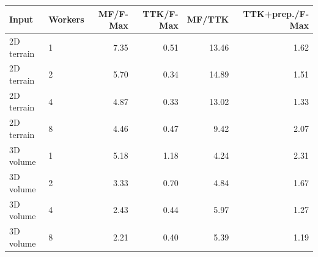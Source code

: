 \begin{tabular}{llrrrr}
\toprule
Input & Workers & MF/F-Max & TTK/F-Max & MF/TTK & TTK+prep./F-Max \\
\midrule
2D terrain & 1 & 7.35 & 0.51 & 13.46 & 1.62 \\
2D terrain & 2 & 5.70 & 0.34 & 14.89 & 1.51 \\
2D terrain & 4 & 4.87 & 0.33 & 13.02 & 1.33 \\
2D terrain & 8 & 4.46 & 0.47 & 9.42 & 2.07 \\
\midrule
3D volume & 1 & 5.18 & 1.18 & 4.24 & 2.31 \\
3D volume & 2 & 3.33 & 0.70 & 4.84 & 1.67 \\
3D volume & 4 & 2.43 & 0.44 & 5.97 & 1.27 \\
3D volume & 8 & 2.21 & 0.40 & 5.39 & 1.19 \\
\bottomrule
\end{tabular}

